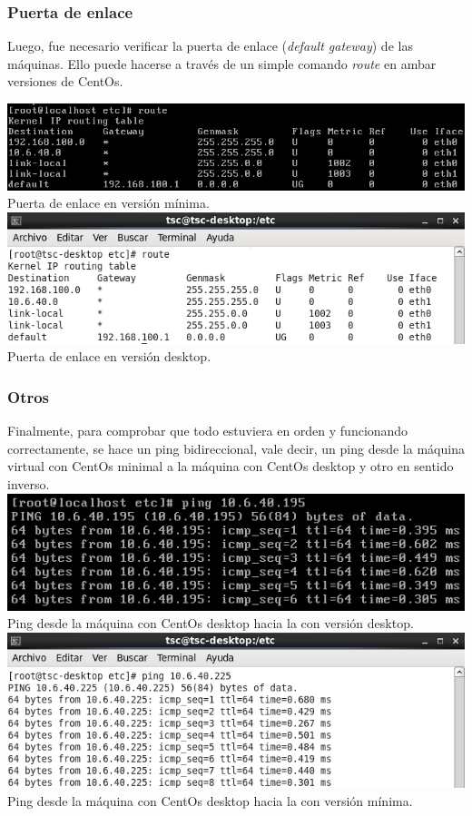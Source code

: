 \documentclass[11pt]{article}
\begin{document}
\subsubsection{Puerta de enlace}
	Luego, fue necesario verificar la puerta de enlace (\textit{default gateway}) de las máquinas. Ello puede hacerse a través de un simple comando \textit{route} en ambar versiones de CentOs.

\includegraphics[width=.75\linewidth]{screenshots/minimal/route.png}
    \\Puerta de enlace en versión mínima.\\

\includegraphics[width=.75\linewidth]{screenshots/desktop/route.png}
    \\Puerta de enlace en versión desktop.\\
    
\subsubsection{Otros}
    Finalmente, para comprobar que todo estuviera en orden y funcionando correctamente, se hace un ping bidireccional, vale decir, un ping desde la máquina virtual con CentOs minimal a la máquina con CentOs desktop y otro en sentido inverso.\\
    
\includegraphics[width=.75\linewidth]{screenshots/minimal/ping-to-desktop.png}
    \\Ping desde la máquina con CentOs desktop hacia la con versión desktop.\\
    
\includegraphics[width=.75\linewidth]{screenshots/desktop/ping-to-min.png}
    \\Ping desde la máquina con CentOs desktop hacia la con versión mínima.\\    
    
\end{document}
